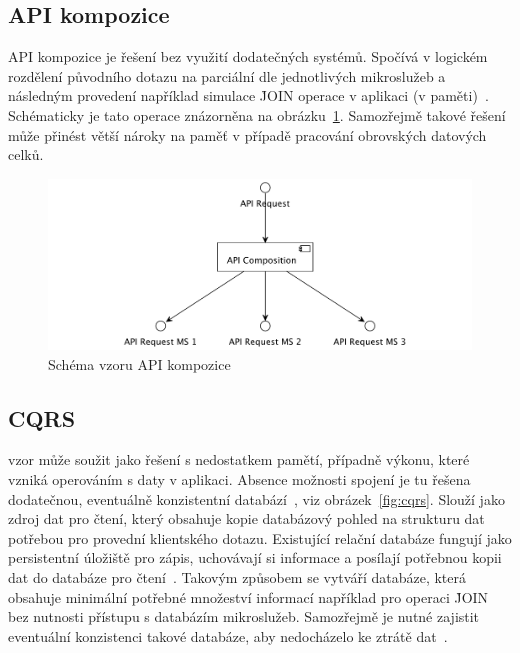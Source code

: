 \subsection{API kompozice}\label{subsec:msa-db-aggregate-api}

API kompozice je řešení bez využití dodatečných systémů.
Spočívá v logickém rozdělení původního dotazu na parciální dle jednotlivých mikroslužeb a následným provedení například simulace \h{JOIN} operace v aplikaci (v paměti)~\cite{apicomposition}.
Schématicky je tato operace znázorněna na obrázku~\ref{fig:api-composition}.
Samozřejmě takové řešení může přinést větší nároky na paměť v případě pracování obrovských datových celků.


\begin{figure}[htbp]
   \centering
   \includegraphics[max width=\textwidth]{assets/api-composition}
   \caption{Schéma vzoru API kompozice}\label{fig:api-composition}
\end{figure}



\subsection{CQRS}\label{subsec:msa-db-aggregate-cqrs}

 vzor může soužit jako řešení s nedostatkem pamětí, případně výkonu, které vzniká operováním s daty v aplikaci.
Absence možnosti spojení je tu řešena dodatečnou, eventuálně konzistentní databází~\cite{msachris}, viz obrázek~\ref{fig:cqrs}.
Slouží jako zdroj dat pro čtení, který obsahuje kopie databázový pohled na strukturu dat potřebou pro provední klientského dotazu.
Existující relační databáze fungují jako persistentní úložiště pro zápis, uchovávají si informace a posílají potřebnou kopii dat do databáze pro čtení~\cite{cqrs}.
Takovým způsobem se vytváří databáze, která obsahuje minimální potřebné množeství informací například pro operaci \h{JOIN} bez nutnosti přístupu s databázím mikroslužeb.
Samozřejmě je nutné zajistit eventuální konzistenci takové databáze, aby nedocházelo ke ztrátě dat~\cite{cqrs}.



